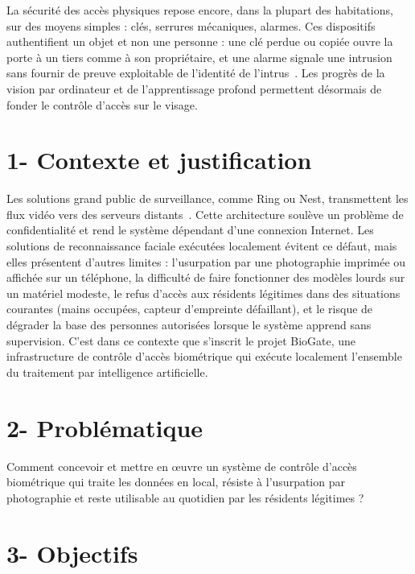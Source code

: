 
La sécurité des accès physiques repose encore, dans la plupart des habitations, sur des moyens simples : clés, serrures mécaniques, alarmes. Ces dispositifs authentifient un objet et non une personne : une clé perdue ou copiée ouvre la porte à un tiers comme à son propriétaire, et une alarme signale une intrusion sans fournir de preuve exploitable de l'identité de l'intrus~\asourcer. Les progrès de la vision par ordinateur et de l'apprentissage profond permettent désormais de fonder le contrôle d'accès sur le visage.

\section*{1- Contexte et justification}

Les solutions grand public de surveillance, comme Ring ou Nest, transmettent les flux vidéo vers des serveurs distants~\asourcer. Cette architecture soulève un problème de confidentialité et rend le système dépendant d'une connexion Internet. Les solutions de reconnaissance faciale exécutées localement évitent ce défaut, mais elles présentent d'autres limites : l'usurpation par une photographie imprimée ou affichée sur un téléphone, la difficulté de faire fonctionner des modèles lourds sur un matériel modeste, le refus d'accès aux résidents légitimes dans des situations courantes (mains occupées, capteur d'empreinte défaillant), et le risque de dégrader la base des personnes autorisées lorsque le système apprend sans supervision. C'est dans ce contexte que s'inscrit le projet BioGate, une infrastructure de contrôle d'accès biométrique qui exécute localement l'ensemble du traitement par intelligence artificielle.

\section*{2- Problématique}

Comment concevoir et mettre en œuvre un système de contrôle d'accès biométrique qui traite les données en local, résiste à l'usurpation par photographie et reste utilisable au quotidien par les résidents légitimes ?

\section*{3- Objectifs}

